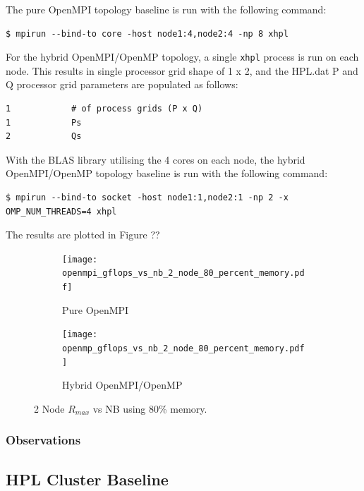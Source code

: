 \documentclass{report}
\begin{document}
The pure OpenMPI topology baseline is run with the following command:

\lstset{style=type}
\begin{lstlisting}[]
$ mpirun --bind-to core -host node1:4,node2:4 -np 8 xhpl
\end{lstlisting}

For the hybrid OpenMPI/OpenMP topology, a single \verb|xhpl| process is run on each node. This results in single processor grid shape of 1 x 2, and the HPL.dat P and Q processor grid parameters are populated as follows:

\lstset{style=listing}
\begin{lstlisting}[numbers=none]
1            # of process grids (P x Q)
1            Ps
2            Qs
\end{lstlisting}

With the BLAS library utilising the 4 cores on each node, the hybrid OpenMPI/OpenMP topology baseline is run with the following command:

\lstset{style=type}
\begin{lstlisting}[]
$ mpirun --bind-to socket -host node1:1,node2:1 -np 2 -x OMP_NUM_THREADS=4 xhpl
\end{lstlisting}

The results are plotted in Figure ??

\begin{figure}[H]
	\begin{subfigure}{1.0\textwidth}
		\centering
		\texttt{[image: openmpi\_gflops\_vs\_nb\_2\_node\_80\_percent\_memory.pdf]}
		\caption{Pure OpenMPI}
		\label{fig:subim1}
	\end{subfigure}
	\par\bigskip
	\begin{subfigure}{1.0\textwidth}
		\centering
		\texttt{[image: openmp\_gflops\_vs\_nb\_2\_node\_80\_percent\_memory.pdf]}
		\caption{Hybrid OpenMPI/OpenMP}
		\label{fig:subim2}
	\end{subfigure}
\caption{2 Node $R_{max}$ vs NB using 80\% memory.}
\label{fig:image2}
\end{figure}



%
%
\subsubsection{Observations}




%
%
\subsection{HPL Cluster Baseline}
\end{document}
